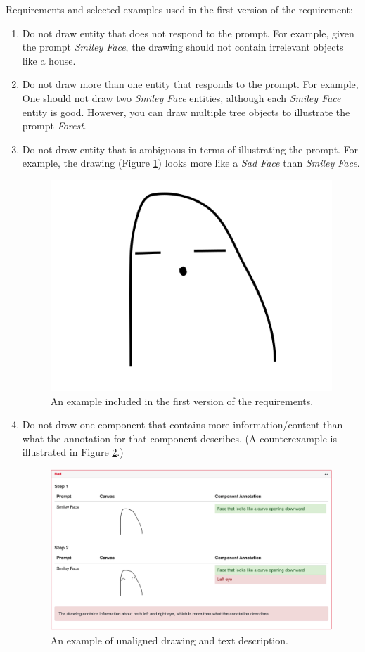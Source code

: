 Requirements and selected examples used in the first version of the requirement:
\begin{enumerate}
\item Do not draw entity that does not respond to the prompt. For example, given the prompt \textit{Smiley Face}, the drawing should not contain irrelevant objects like a house. 
\item Do not draw more than one entity that responds to the prompt. For example, One should not draw two \textit{Smiley Face} entities, although each \textit{Smiley Face} entity is good. However, you can draw multiple tree objects to illustrate the prompt \textit{Forest}.  
\item \label{v1_requirement1_3} Do not draw entity that is ambiguous in terms of illustrating the prompt. For example, the drawing (Figure \ref{v1.requirement_1.1}) looks more like a \textit{Sad Face} than \textit{Smiley Face}.
\begin{figure}[!h]
\centering
\includegraphics[width=.3\linewidth]{data_collection/host_amazon/hit_1/bad_smiley_face_ambiguous_face.png}
\caption{An example included in the first version of the requirements.}
\label{v1.requirement_1.1}
\end{figure}

\item Do not draw one component that contains more information/content than what the annotation for that component describes. (A counterexample is illustrated in Figure \ref{v1.requirement_1.2}.)
\begin{figure}[!h]
\centering
\includegraphics[width=.8\linewidth]{data_collection/v1_requirement1_bad1.png}  
\caption{An example of unaligned drawing and text description.}
\label{v1.requirement_1.2}
\end{figure}


\end{enumerate}
